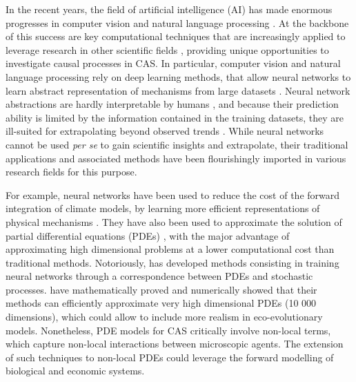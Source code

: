 In the recent years, the field of artificial intelligence (AI) has made enormous progresses in computer vision \cite{XXX} and natural language processing \cite{XXX}. At the backbone of this success are key computational techniques that are increasingly applied to leverage research in other scientific fields \cite{Kashinath2021,Schneider2017,Yazdani2020,Rolnick2023}, providing unique opportunities to investigate causal processes in CAS.
% 
% 
% 
% 
% 
In particular, computer vision and natural language processing rely on deep learning methods, that allow neural networks to learn abstract representation of mechanisms from large datasets \cite{LeCun2015}.
% 
Neural network abstractions are hardly interpretable by humans \cite{XXX}, and because their prediction ability is limited by the information contained in the training datasets, they are ill-suited for extrapolating beyond observed trends \cite{Barnosky2012,Urban2016}. %
% 
While neural networks cannot be used \textit{per se} to gain scientific insights and extrapolate, their traditional applications and associated methods have been flourishingly imported in various research fields for this purpose.

%
For example, neural networks have been used to reduce the cost of the forward integration of climate models, by learning more efficient representations of physical mechanisms \cite{XXX}.
% 
They have also been used to approximate the solution of partial differential equations (PDEs) \cite{sirignano2018dgm}, with the major advantage of approximating high dimensional problems at a lower computational cost than traditional methods.
% 
Notoriously, \cite{Arnulf} has developed methods consisting in training neural networks through a correspondence between PDEs and stochastic processes. \cite{Arnulf} have mathematically proved and numerically showed that their methods can efficiently approximate very high dimensional PDEs (10 000 dimensions), which could allow to include more realism in eco-evolutionary models.
% 
Nonetheless, PDE models for CAS critically involve non-local terms, which capture non-local interactions between microscopic agents. The extension of such techniques to non-local PDEs could leverage the forward modelling of biological and economic systems.

